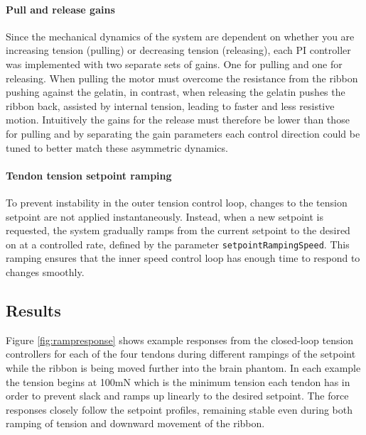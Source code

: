 \paragraph*{Pull and release gains}
Since the mechanical dynamics of the system are dependent on whether you are increasing tension (pulling) or decreasing tension (releasing), each PI controller was implemented with two separate sets of gains. One for pulling and one for releasing. When pulling the motor must overcome the resistance from the ribbon pushing against the gelatin, in contrast, when releasing the gelatin pushes the ribbon back, assisted by internal tension, leading to faster and less resistive motion. Intuitively the gains for the release must therefore be lower than those for pulling and by separating the gain parameters each control direction could be tuned to better match these asymmetric dynamics.

\paragraph*{Tendon tension setpoint ramping}
To prevent instability in the outer tension control loop, changes to the tension setpoint are not applied instantaneously. Instead, when a new setpoint is requested, the system gradually ramps from the current setpoint to the desired on at a controlled rate, defined by the parameter \texttt{setpointRampingSpeed}. This ramping ensures that the inner speed control loop has enough time to respond to changes smoothly.


\subsection{Results}
Figure \ref{fig:rampresponse} shows example responses from the closed-loop tension controllers for each of the four tendons during different rampings of the setpoint while the ribbon is being moved further into the brain phantom. In each example the tension begins at 100mN which is the minimum tension each tendon has in order to prevent slack and ramps up linearly to the desired setpoint. The force responses closely follow the setpoint profiles, remaining stable even during both ramping of tension and downward movement of the ribbon.

